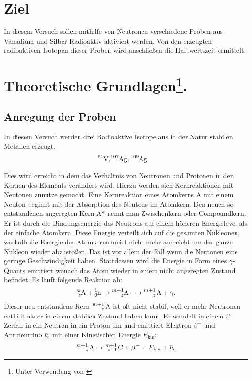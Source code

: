 \section{Ziel}
In diesem Versuch sollen mithilfe von Neutronen verschiedene Proben aus Vanadium und Silber
 Radioaktiv aktiviert werden.
Von den erzeugten radioaktiven Isotopen dieser Proben wird anschließen die Halbwertszeit ermittelt.

\section[Theoretische Grundlagen]{Theoretische Grundlagen\footnote[1]{Unter Verwendung von \cite[]{man:v702}}.}


\subsection{Anregung der Proben}

\noindent
In diesem Versuch werden drei Radioaktive Isotope aus in der Natur stabilen Metallen erzeugt.
\begin{align}
    \ce{^{51}V}, & \ce{^{107}Ag},  \ce{^{109}Ag}
\end{align}

Dies wird erreicht in dem das Verhältnis von Neutronen und Protonen in den Kernen des Elements verändert wird.
Hierzu werden sich Kernreaktionen mit Neutonen zunutze gemacht.
Eine Kernreaktion eines Atomkerns A mit einem Neuton beginnt mit der Absorption des Neutons im Atomkern.
Den neuen so entstandenen angeregten Kern A* nennt man Zwischenkern oder Compoundkern.
Er ist durch die Bindungsenergie des Neutrons auf einem höheren Energielevel als der einfache Atomkern.
Diese Energie verteilt sich auf die gesamten Nukleonen, weshalb die Energie des Atomkerns meist nicht mehr ausreicht
um das ganze Nukleon wieder abzustoßen.
Das ist vor allem der Fall wenn die Neutonen eine geringe Geschwindigkeit haben.
Stattdessen wird die Energie in Form eines $\gamma$-Quants emittiert wonach das Atom wieder in einem nicht angeregten Zustand befindet.
Es läuft folgende Reaktion ab:
\begin{align*}
    \ce{^{m}_{z}A} + \ce{^{1}_{0}n} \rightarrow \ce{^{m+1}_{z}A*} \rightarrow \ce{^{m+1}_{z} A} + \gamma .
\end{align*}
Dieser neu entstandene Kern $\ce{^{m+1}_{z} A}$ ist oft nicht stabil, weil er mehr Neutronen enthält
als er in einem stabilen Zustand haben kann.
Er wandelt in einem $\beta^{-}$-Zerfall in ein Neutron in ein Proton um und emittiert 
Elektron $\beta^{-}$ und Antineutrino $\overline{\nu}_\text{e}$ mit einer Kinetischen Energie $E_\text{kin}$:
\begin{align*}
    \ce{^{m+1}_{z} A} \rightarrow \ce{^{m+1}_{z+1} C} + \beta^{-} + E_\text{kin} + \overline{\nu}_\text{e}
\end{align*}

